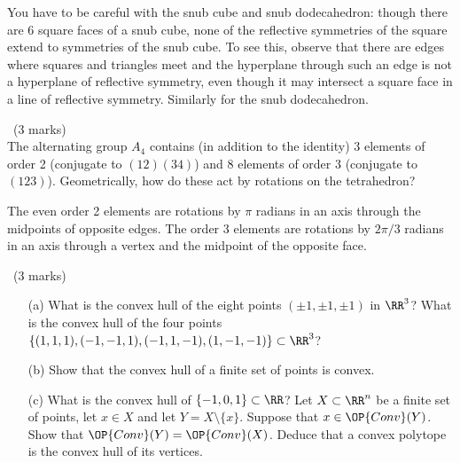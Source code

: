 \documentclass[12pt]{article}
\begin{document}
\begin{answer}
\begin{enumerate}
    You have to be careful with the snub cube and snub dodecahedron: though there are 6 square faces of a snub cube, none of the reflective symmetries of the square extend to symmetries of the snub cube. To see this, observe that there are edges where squares and triangles meet and the hyperplane through such an edge is not a hyperplane of reflective symmetry, even though it may intersect a square face in a line of reflective symmetry. Similarly for the snub dodecahedron.
  \end{enumerate}
\end{answer}

\newpage

\begin{question}\ (3 marks)\\
  The alternating group $A_4$ contains (in addition to the identity) 3 elements of order 2 (conjugate to $(12)(34)$) and 8 elements of order 3 (conjugate to $(123)$). Geometrically, how do these act by rotations on the tetrahedron?
\end{question}

\begin{answer}
The even order 2 elements are rotations by $\pi$ radians in an axis through the midpoints of opposite edges. The order 3 elements are rotations by $2\pi/3$ radians in an axis through a vertex and the midpoint of the opposite face.
\end{answer}
\newpage

\vspace{1cm}

\begin{question}\ (3 marks)
  \begin{enumerate}
  \item[(a)] What is the convex hull of the eight points $(\pm 1,\pm 1,\pm 1)$ in $\RR^3$? What is the convex hull of the four points $\{(1,1,1),(-1,-1,1),(-1,1,-1),(1,-1,-1)\}\subset\RR^3$?
  \item[(b)] Show that the convex hull of a finite set of points is convex.
  \item[(c)] What is the convex hull of $\{-1,0,1\}\subset\RR$? Let $X\subset\RR^n$ be a finite set of points, let $x\in X$ and let $Y=X\setminus\{x\}$. Suppose that $x\in\OP{Conv}(Y)$. Show that $\OP{Conv}(Y)=\OP{Conv}(X)$. Deduce that a convex polytope is the convex hull of its vertices.
  \end{enumerate}
\end{question}
\end{document}
